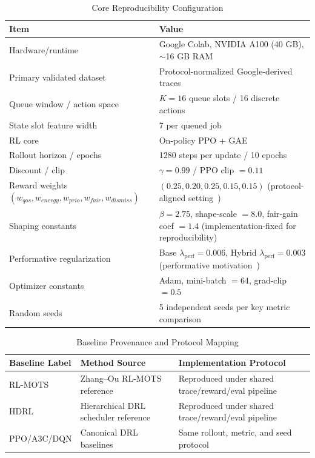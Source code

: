 \documentclass[journal]{IEEEtran}
\begin{document}
\begin{table}[t]
\centering
\caption{Core Reproducibility Configuration}
\label{tab:repro_config}
\footnotesize
\begin{tabular*}{\textwidth}{@{\extracolsep{\fill}}ll@{}}
\toprule
\textbf{Item} & \textbf{Value} \\
\midrule
Hardware/runtime & Google Colab, NVIDIA A100 (40 GB), $\sim$16 GB RAM \\
Primary validated dataset & Protocol-normalized Google-derived traces \\
Queue window / action space & $K=16$ queue slots / 16 discrete actions \\
State slot feature width & 7 per queued job \\
RL core & On-policy PPO + GAE \\
Rollout horizon / epochs & 1280 steps per update / 10 epochs \\
Discount / clip & $\gamma=0.99$ / PPO clip $=0.11$ \\
Reward weights $(w_{qos},w_{energy},w_{prio},w_{fair},w_{dismiss})$ & $(0.25, 0.20, 0.25, 0.15, 0.15)$ (protocol-aligned setting~\cite{zhang2025s41598}) \\
Shaping constants & $\beta=2.75$, shape-scale $=8.0$, fair-gain coef $=1.4$ (implementation-fixed for reproducibility) \\
Performative regularization & Base $\lambda_{\text{perf}}=0.006$, Hybrid $\lambda_{\text{perf}}=0.003$ (performative motivation~\cite{perdomo2020performative,mandal2023performative}) \\
Optimizer constants & Adam, mini-batch $=64$, grad-clip $=0.5$ \\
Random seeds & 5 independent seeds per key metric comparison \\
\bottomrule
\end{tabular*}
\end{table}

\begin{table}[t]
\centering
\caption{Baseline Provenance and Protocol Mapping}
\label{tab:baseline_provenance}
\footnotesize
\begin{tabular*}{\textwidth}{@{\extracolsep{\fill}}lll@{}}
\toprule
\textbf{Baseline Label} & \textbf{Method Source} & \textbf{Implementation Protocol} \\
\midrule
RL-MOTS & Zhang--Ou RL-MOTS reference~\cite{zhang2025s41598} & Reproduced under shared trace/reward/eval pipeline \\
HDRL & Hierarchical DRL scheduler reference~\cite{zhang2024hdrl} & Reproduced under shared trace/reward/eval pipeline \\
PPO/A3C/DQN & Canonical DRL baselines~\cite{schulman2017proximal,mnih2016asynchronous} & Same rollout, metric, and seed protocol \\
\bottomrule
\end{tabular*}
\end{table}
\end{document}
